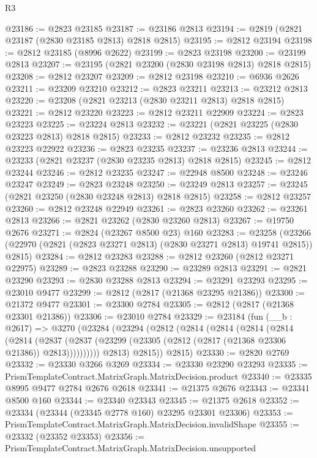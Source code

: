 \begin{lexlean}{R3}
\begin{coremodule}
@23186 := @2823 @23185
@23187 := @23186 @2813
@23194 := @2819 (@2821 @23187 (@2830 @23185 @2813) @2818 @2815)
@23195 := @2812 @23194
@23198 := @2812 @23185 (@8996 @2622)
@23199 := @2823 @23198
@23200 := @23199 @2813
@23207 := @23195 (@2821 @23200 (@2830 @23198 @2813) @2818 @2815)
@23208 := @2812 @23207
@23209 := @2812 @23198
@23210 := @6936 @2626
@23211 := @23209 @23210
@23212 := @2823 @23211
@23213 := @23212 @2813
@23220 := @23208 (@2821 @23213 (@2830 @23211 @2813) @2818 @2815)
@23221 := @2812 @23220
@23223 := @2812 @23211 @22909
@23224 := @2823 @23223
@23225 := @23224 @2813
@23232 := @23221 (@2821 @23225 (@2830 @23223 @2813) @2818 @2815)
@23233 := @2812 @23232
@23235 := @2812 @23223 @22922
@23236 := @2823 @23235
@23237 := @23236 @2813
@23244 := @23233 (@2821 @23237 (@2830 @23235 @2813) @2818 @2815)
@23245 := @2812 @23244
@23246 := @2812 @23235
@23247 := @22948 @8500
@23248 := @23246 @23247
@23249 := @2823 @23248
@23250 := @23249 @2813
@23257 := @23245 (@2821 @23250 (@2830 @23248 @2813) @2818 @2815)
@23258 := @2812 @23257
@23260 := @2812 @23248 @22949
@23261 := @2823 @23260
@23262 := @23261 @2813
@23266 := @2821 @23262 (@2830 @23260 @2813)
@23267 := @19750 @2676
@23271 := @2824 (@23267 @8500 @23) @160
@23283 := @23258
    (@23266 (@22970 (@2821 (@2823 @23271 @2813) (@2830 @23271 @2813) @19741 @2815)) @2815)
@23284 := @2812 @23283
@23288 := @2812 @23260 (@2812 @23271 @22975)
@23289 := @2823 @23288
@23290 := @23289 @2813
@23291 := @2821 @23290
@23293 := @2830 @23288 @2813
@23294 := @23291 @23293
@23295 := @23010 @9477
@23299 := @2812 (@2817 (@21368 @23295 @21386))
@23300 := @21372 @9477
@23301 := @23300 @2784
@23305 := @2812 (@2817 (@21368 @23301 @21386))
@23306 := @23010 @2784
@23329 := @23184
    (fun (__b : @2617) =>
    @3270
      (@23284
        (@23294
          (@2812
            (@2814
              (@2814
                (@2814
                  (@2814
                    (@2814
                      (@2837
                        (@2837 (@23299 (@23305 (@2812 (@2817 (@21368 @23306 @21386)) @2813))))))))))
            @2813)
          @2815))
      @2815)
@23330 := @2820 @2769
@23332 := @23330 @3266 @3269
@23334 := @23330 @23290 @23293
@23335 := PrismTemplateContract.MatrixGraph.MatrixDecision.product
@23340 := @23335 @8995 @9477 @2784 @2676 @2618
@23341 := @21375 @2676
@23343 := @23341 @8500 @160
@23344 := @23340 @23343
@23345 := @21375 @2618
@23352 := @23334 (@23344 (@23345 @2778 @160) @23295 @23301 @23306)
@23353 := PrismTemplateContract.MatrixGraph.MatrixDecision.invalidShape
@23355 := @23332 (@23352 @23353)
@23356 := PrismTemplateContract.MatrixGraph.MatrixDecision.unsupported

\end{coremodule}
\end{lexlean}
